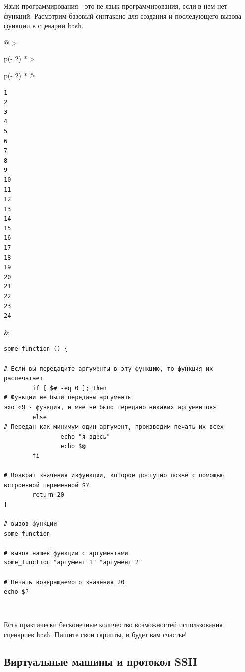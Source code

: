 \documentclass{article}
\begin{document}
Язык программирования - это не язык программирования, если в нем нет
функций. Расмотрим базовый синтаксис для создания и последующего вызова
функции в сценарии bash.

\begin{longtable}[]{@{}
  >{\raggedright\arraybackslash}p{(\columnwidth - 2\tabcolsep) * }
  >{\raggedright\arraybackslash}p{(\columnwidth - 2\tabcolsep) * }@{}}
\toprule
\endhead
\begin{minipage}[t]{\linewidth}\raggedright
\begin{verbatim}
1
2
3
4
5
6
7
8
9
10
11
12
13
14
15
16
17
18
19
20
21
22
23
24
\end{verbatim}
\end{minipage} & \begin{minipage}[t]{\linewidth}\raggedright
\begin{verbatim}
some_function () {

# Если вы передадите аргументы в эту функцию, то функция их распечатает
        if [ $# -eq 0 ]; then
# Функции не были переданы аргументы
эхо «Я - функция, и мне не было передано никаких аргументов»
        else
# Передан как минимум один аргумент, производим печать их всех
                echo "я здесь"
                echo $@
        fi

# Возврат значения изфункции, которое доступно позже с помощью встроенной переменной $?
        return 20
}

# вызов функции
some_function

# вызов нашей функции с аргументами
some_function "аргумент 1" "аргумент 2"

# Печать возвращаемого значения 20
echo $?
\end{verbatim}
\end{minipage} \\ \addlinespace
\bottomrule
\end{longtable}

Есть практически бесконечные количество возможностей использования
сценариев bash. Пишите свои скрипты, и будет вам счастье!

\hypertarget{Virtual-Machines-and-SSH-Protocol}{%
\subsection{\texorpdfstring{\protect\hyperlink{Virtual-Machines-and-SSH-Protocol}{}Виртуальные
машины и протокол
SSH}{Виртуальные машины и протокол SSH}}\label{Virtual-Machines-and-SSH-Protocol}}
\end{document}
